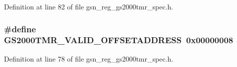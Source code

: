 Definition at line 82 of file gsn\_\-reg\_\-gs2000tmr\_\-spec.h.

\hypertarget{a00556_a498c965135be6d53c8376d963b3ea397}{
\subsubsection[{GS2000TMR\_\-VALID\_\-OFFSETADDRESS}]{\setlength{\rightskip}{0pt plus 5cm}\#define GS2000TMR\_\-VALID\_\-OFFSETADDRESS~0x00000008}}
\label{a00556_a498c965135be6d53c8376d963b3ea397}


Definition at line 78 of file gsn\_\-reg\_\-gs2000tmr\_\-spec.h.

